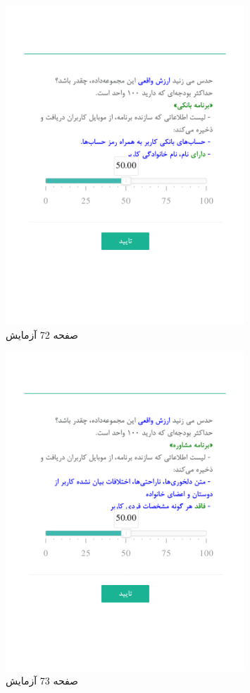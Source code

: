 \begin{figure}[htpb]
    \centering
    \includegraphics[width=0.8\textwidth]{./img/Task72.png}
    \caption{ صفحه 72 آزمایش }
    \label{fig:Task72}
\end{figure}


\begin{figure}[htpb]
    \centering
    \includegraphics[width=0.8\textwidth]{./img/Task73.png}
    \caption{ صفحه 73 آزمایش }
    \label{fig:Task73}
\end{figure}


